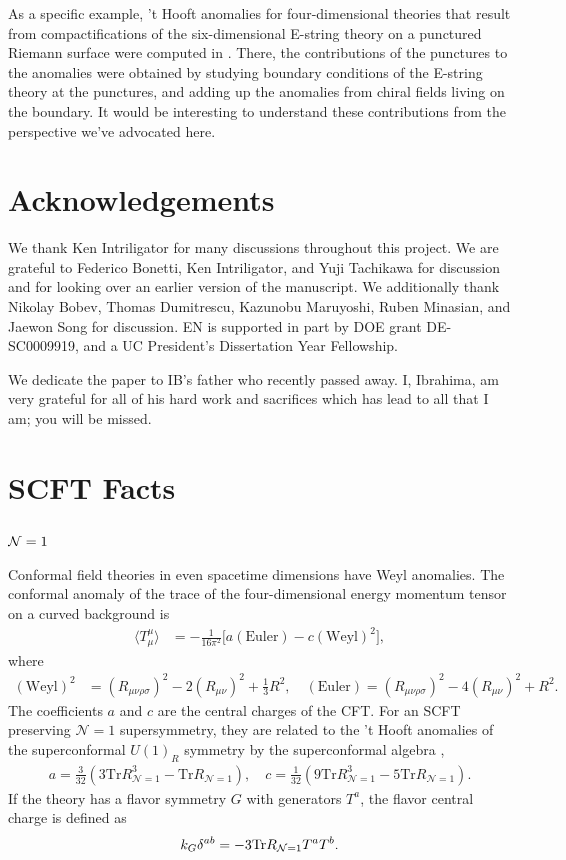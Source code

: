 \documentclass[a4paper,11pt]{article}
\newcommand{\ba}[1]{\begin{align} #1 \end{align} }
\def\tr{\text{Tr}}
\def\CN{{\cal N}}
\newcommand{\mc}[1]{\mathcal{ #1} }
\begin{document}
As a specific example, 't Hooft anomalies for four-dimensional theories that result from compactifications of the six-dimensional E-string theory on a punctured Riemann surface were computed in \cite{Kim:2017toz}. There, the contributions of the punctures to the anomalies were obtained by studying boundary conditions of the E-string theory at the punctures, and adding up the anomalies from chiral fields living on the boundary. It would be interesting to understand these contributions from the perspective we've advocated here.



\section*{Acknowledgements}


We thank Ken Intriligator for many discussions throughout this project. We are grateful to Federico Bonetti, Ken Intriligator, and Yuji Tachikawa for discussion and for looking over an earlier version of the manuscript.  We additionally thank Nikolay Bobev, Thomas Dumitrescu, Kazunobu Maruyoshi, Ruben Minasian, and Jaewon Song for discussion. EN is supported in part by DOE grant DE-SC0009919, and a UC President's Dissertation Year Fellowship.

We dedicate the paper to IB's father who recently passed away.  I, Ibrahima, am very grateful for all of his hard work and sacrifices which has lead to all that I am; you will be missed.  


\appendix


\section{SCFT Facts}
\label{sec:scfts}

\subsection{$\CN=1$}%

Conformal field theories in even spacetime dimensions have Weyl anomalies. The conformal anomaly of the trace of the four-dimensional energy momentum tensor on a curved background is
	\ba{
	\langle T_\mu^\mu \rangle &= -\frac{1}{16\pi^2} \big[ {a}(\text{Euler})-{c} (\text{Weyl})^2\big],
	}
where
	\ba{
	 (\text{Weyl})^2 &= (R_{\mu\nu\rho\sigma})^2 - 2 (R_{\mu\nu})^2 + \frac{1}{3} R^2,\quad
	 (\text{Euler}) = (R_{\mu\nu\rho\sigma})^2 - 4 (R_{\mu\nu})^2 + R^2.
	}
The coefficients $a$ and $c$ are the central charges of the CFT. For an SCFT preserving $\mc{N}=1$ supersymmetry, they are related to the 't Hooft anomalies of the superconformal $U(1)_R$ symmetry by the superconformal algebra \cite{Anselmi:1997am},
	\ba{
	a = \frac{3}{32}\left( 3 \tr R^3_{\mc{N}=1} - \tr R_{\mc{N}=1}\right),\quad c = \frac{1}{32} \left( 9 \tr R^3_{\mc{N}=1} - 5 \tr R_{\mc{N}=1}\right).
	}
If the theory has a flavor symmetry $G$ with generators $T^a$, the flavor central charge is defined as
	\ba{
	k_G\delta^{ab}=-3\tr R_{\CN=1}T^aT^b.
	}
\end{document}
